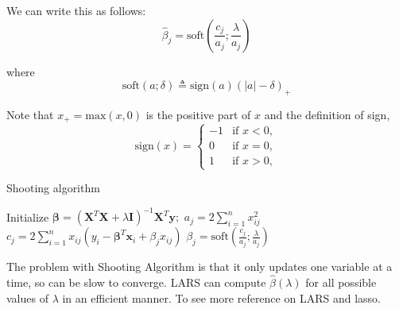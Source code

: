 \documentclass[12pt,a4paper]{article}%
\theoremstyle{definition}
\theoremstyle{plain}
\numberwithin{equation}{section}
\newcounter{subsubsubsection}[subsubsection]
\begin{document}
We can write this as follows:
\begin{equation*}
\hat{\beta}_{j} = \text{soft}(\frac{c_{j}}{a_{j}};\frac{\lambda}{a_{j}})
\end{equation*}

where
\begin{equation*}
\text{soft}(a;\delta) \triangleq  \text{sign}(a) (|a|-\delta)_{+}
\end{equation*}

Note that $x_{+} = \text{max}(x, 0)$ is the positive part of $x$ and the definition of sign,
\begin{equation*} 
\text{sign}(x) = 
\left\{
\begin{array}{ll}
-1  & \mbox{if } x < 0, \\
 0  & \mbox{if } x = 0, \\
 1  & \mbox{if } x > 0,
\end{array} \right.
\end{equation*}

\begin{algorithm}[H]
\caption{Shooting algorithm}\label{ShootingAlgorithm}
\begin{algorithmic}[1]
\State Initialize $\boldsymbol{\beta} = (\mathbf{X}^{T}\mathbf{X} + \lambda \mathbf{I})^{-1}\mathbf{X}^{T}\mathbf{y} ;$
\Repeat
{}
\State $a_{j} = 2 \sum\limits_{i=1}^{n} x_{ij}^{2}$
\State $c_{j} = 2\sum\limits_{i=1}^{n} x_{ij}(y_{i} - \boldsymbol{\beta}^{T}\mathbf{x}_{i}+\beta_{j}x_{ij})$
\State $\beta_{j} = \text{soft}(\frac{c_{j}}{a_{j}};\frac{\lambda}{a_{j}})$
\EndFor
{}
\end{algorithmic}
\end{algorithm}

The problem with Shooting Algorithm is that it only updates one variable at a time, so can be slow to converge. 
LARS can compute $\hat\beta(\lambda)$ for all possible values of $\lambda$ in an efficient manner. To see more reference on LARS and lasso. \footnotemark
{}


\end{document}
